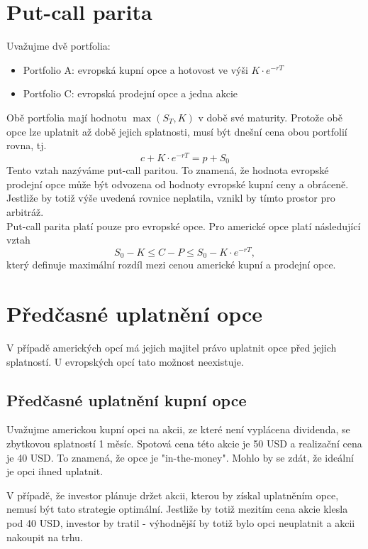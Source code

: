 \documentclass[a4paper]{book}
\begin{document}
\section{Put-call parita}

Uvažujme dvě portfolia:
\begin{itemize}
\item Portfolio A: evropská kupní opce a hotovost ve výši $K \cdot e^{-rT}$
\item Portfolio C: evropská prodejní opce a jedna akcie
\end{itemize}
Obě portfolia mají hodnotu $\max(S_T,K)$ v době své maturity. Protože obě opce lze uplatnit až době jejich splatnosti, musí být dnešní cena obou portfolií rovna, tj.
\begin{equation*}
c+K \cdot e^{-rT} = p + S_0
\end{equation*}
Tento vztah nazýváme put-call paritou. To znamená, že hodnota evropské prodejní opce může být odvozena od hodnoty evropské kupní ceny a obráceně. Jestliže by totiž výše uvedená rovnice neplatila, vznikl by tímto prostor pro arbitráž.\\
Put-call parita platí pouze pro evropské opce. Pro americké opce platí následující vztah
\begin{equation*}
S_0 - K \le C - P \le S_0 - K \cdot e^{-rT}, 
\end{equation*}
který definuje maximální rozdíl mezi cenou americké kupní a prodejní opce.

\section{Předčasné uplatnění opce}

V případě amerických opcí má jejich majitel právo uplatnit opce před jejich splatností. U evropských opcí tato možnost neexistuje.

\subsection{Předčasné uplatnění kupní opce}

Uvažujme americkou kupní opci na akcii, ze které není vyplácena dividenda, se zbytkovou splatností 1 měsíc. Spotová cena této akcie je 50 USD a realizační cena je 40 USD. To znamená, že opce je "in-the-money". Mohlo by se zdát, že ideální je opci ihned uplatnit.

V případě, že investor plánuje držet akcii, kterou by získal uplatněním opce, nemusí být tato strategie optimální. Jestliže by totiž mezitím cena akcie klesla pod 40 USD, investor by tratil - výhodnější by totiž bylo opci neuplatnit a akcii nakoupit na trhu.
\end{document}
